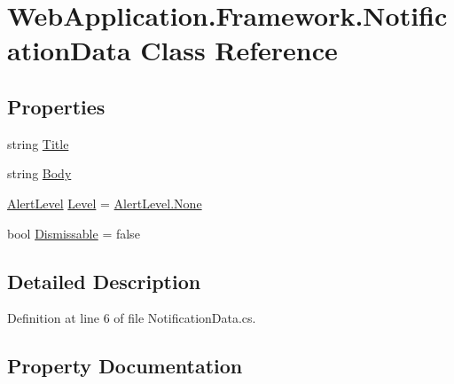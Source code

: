 \hypertarget{classWebApplication_1_1Framework_1_1NotificationData}{}\section{Web\+Application.\+Framework.\+Notification\+Data Class Reference}
\label{classWebApplication_1_1Framework_1_1NotificationData}
\subsection*{Properties}
\begin{DoxyCompactItemize}
\item 
string \mbox{\hyperlink{classWebApplication_1_1Framework_1_1NotificationData_a4c00314a56a6d3bd97d52af56b783783}{Title}}
\item 
string \mbox{\hyperlink{classWebApplication_1_1Framework_1_1NotificationData_aca31e2b61507fdebd750599dd991abf2}{Body}}
\item 
\mbox{\hyperlink{classWebApplication_1_1Framework_1_1AlertLevel}{Alert\+Level}} \mbox{\hyperlink{classWebApplication_1_1Framework_1_1NotificationData_ac1591decc21761f82c8d173e516edd46}{Level}} = \mbox{\hyperlink{classWebApplication_1_1Framework_1_1AlertLevel_ae3fedb6b350a354a160e3da9b32f3d2a}{Alert\+Level.\+None}}
\item 
bool \mbox{\hyperlink{classWebApplication_1_1Framework_1_1NotificationData_a409f1263421e05266791f0021aeae189}{Dismissable}} = false
\end{DoxyCompactItemize}


\subsection{Detailed Description}


Definition at line 6 of file Notification\+Data.\+cs.



\subsection{Property Documentation}
\mbox{\label{classWebApplication_1_1Framework_1_1NotificationData_aca31e2b61507fdebd750599dd991abf2}} 
